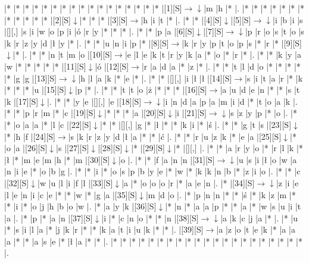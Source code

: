 \documentclass[11pt]{article}
\newcommand\drarr{$\rightarrow \!\!\!\!\! \downarrow$}
\newcommand\rarr{$\rightarrow$}
\newcommand\darr{$\downarrow$}
\begin{document}
\noindent\begin{Puzzle}{20}{25}|*	|*	|*	|*	|*	|*	|*	|*	|*	|*	|*	|*	|*	|*	|*	|*	|*	|[1][S]\drarr	|m	|h	|*	|.
|*	|*	|*	|*	|*	|*	|*	|*	|*	|*	|*	|*	|[2][S]\darr	|*	|*	|*	|[3][S]\rarr	|h	|i	|t	|*	|.
|*	|*	|[4][S]\darr	|[5][S]\drarr	|i	|b	|i	|s	|[][,]{ }	|s	|i	|w	|o	|p	|i	|ó	|r	|y	|*	|*	|*	|.
|*	|*	|p	|a	|[6][S]\darr	|[7][S]\drarr	|p	|r	|o	|s	|t	|o	|s	|k	|r	|z	|y	|d	|ł	|y	|*	|.
|*	|*	|u	|n	|i	|p	|*	|[8][S]\rarr	|k	|r	|y	|p	|t	|o	|p	|s	|*	|r	|*	|[9][S]\darr	|*	|.
|*	|*	|n	|t	|m	|o	|[10][S]\rarr	|e	|l	|e	|k	|t	|r	|y	|k	|a	|*	|o	|*	|r	|*	|.
|*	|*	|k	|y	|a	|w	|*	|*	|*	|*	|*	|[11][S]\darr	|ó	|[12][S]\rarr	|r	|a	|d	|a	|*	|z	|*	|.
|*	|*	|t	|l	|d	|o	|*	|*	|*	|*	|*	|g	|g	|[13][S]\drarr	|h	|l	|a	|k	|*	|e	|*	|.
|*	|*	|[][,]{ }	|i	|ł	|ł	|[14][S]\rarr	|s	|i	|t	|a	|r	|*	|k	|*	|*	|*	|u	|[15][S]\darr	|p	|*	|.
|*	|*	|t	|t	|o	|ż	|*	|*	|*	|[16][S]\rarr	|a	|u	|d	|e	|n	|*	|*	|s	|t	|k	|[17][S]\darr	|.
|*	|*	|y	|e	|[][,]{ }	|e	|[18][S]\drarr	|i	|n	|d	|a	|p	|a	|m	|i	|d	|*	|t	|o	|a	|k	|.
|*	|*	|p	|r	|m	|*	|c	|[19][S]\darr	|*	|*	|*	|a	|[20][S]\darr	|i	|[21][S]\drarr	|s	|z	|y	|p	|*	|o	|.
|*	|*	|o	|a	|a	|*	|l	|c	|[22][S]\darr	|*	|*	|[][,]{ }	|g	|*	|ł	|*	|*	|k	|i	|*	|ś	|.
|*	|*	|g	|t	|s	|[23][S]\darr	|*	|h	|f	|[24][S]\rarr	|s	|k	|r	|z	|y	|d	|ł	|a	|*	|*	|ć	|.
|*	|*	|r	|u	|z	|k	|*	|e	|a	|[25][S]\darr	|*	|o	|a	|[26][S]\darr	|s	|[27][S]\darr	|[28][S]\darr	|*	|[29][S]\darr	|*	|[][,]{ }	|.
|*	|*	|a	|r	|y	|o	|*	|r	|l	|k	|*	|ł	|*	|m	|e	|m	|h	|*	|m	|[30][S]\darr	|o	|.
|*	|*	|f	|a	|n	|n	|[31][S]\drarr	|u	|s	|i	|ł	|o	|w	|a	|n	|i	|e	|*	|o	|b	|g	|.
|*	|*	|i	|*	|o	|s	|p	|b	|y	|e	|*	|w	|*	|k	|k	|n	|b	|*	|z	|i	|o	|.
|*	|*	|c	|[32][S]\darr	|w	|u	|l	|i	|f	|l	|[33][S]\darr	|a	|*	|o	|o	|o	|r	|*	|a	|e	|n	|.
|*	|[34][S]\drarr	|z	|i	|e	|l	|e	|n	|i	|c	|e	|*	|*	|w	|*	|g	|a	|[35][S]\darr	|m	|d	|o	|.
|*	|p	|n	|n	|*	|*	|ś	|*	|k	|z	|m	|*	|*	|i	|*	|o	|j	|h	|b	|o	|w	|.
|*	|a	|y	|k	|[36][S]\darr	|*	|n	|*	|a	|a	|p	|*	|*	|a	|*	|w	|s	|u	|i	|t	|a	|.
|*	|p	|*	|a	|n	|[37][S]\darr	|i	|*	|c	|n	|o	|*	|*	|n	|[38][S]\drarr	|a	|k	|c	|j	|a	|*	|.
|*	|u	|*	|s	|i	|l	|a	|*	|j	|k	|r	|*	|*	|k	|a	|t	|i	|u	|k	|*	|*	|.
|[39][S]\rarr	|a	|z	|o	|t	|e	|k	|*	|a	|a	|a	|*	|*	|a	|s	|e	|*	|ł	|a	|*	|*	|.
|*	|*	|*	|*	|*	|*	|*	|*	|*	|*	|*	|*	|*	|*	|*	|*	|*	|*	|*	|*	|*	|.\end{Puzzle}

\newpage
\end{document}

